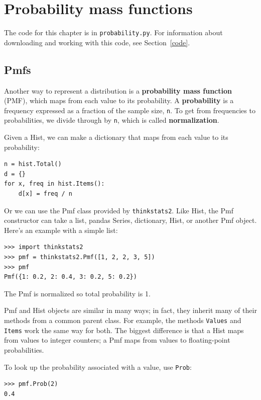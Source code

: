 \documentclass[12pt]{book}
\begin{document}
\chapter{Probability mass functions}

The code for this chapter is in \verb"probability.py".
For information about downloading and
working with this code, see Section~\ref{code}.


\section{Pmfs}

Another way to represent a distribution is a {\bf probability mass
  function} (PMF), which maps from each value to its probability.  A
{\bf probability} is a frequency expressed as a fraction of the sample
size, \verb"n".  To get from frequencies to probabilities, we divide
through by \verb"n", which is called {\bf normalization}.

Given a Hist, we can make a dictionary that maps from each
value to its probability: 
%
\begin{verbatim}
n = hist.Total()
d = {}
for x, freq in hist.Items():
    d[x] = freq / n
\end{verbatim}
%
Or we can use the Pmf class provided by \verb"thinkstats2".
Like Hist, the Pmf constructor can take a list, pandas
Series, dictionary, Hist, or another Pmf object.  Here's an example
with a simple list:
%
\begin{verbatim}
>>> import thinkstats2
>>> pmf = thinkstats2.Pmf([1, 2, 2, 3, 5])
>>> pmf
Pmf({1: 0.2, 2: 0.4, 3: 0.2, 5: 0.2})
\end{verbatim}

The Pmf is normalized so total probability is 1.

Pmf and Hist objects are similar in many ways; in fact, they inherit
many of their methods from a common parent class.  For example, the
methods \verb"Values" and \verb"Items" work the same way for both.  The
biggest difference is that a Hist maps from values to integer
counters; a Pmf maps from values to floating-point probabilities.

To look up the probability associated with a value, use \verb"Prob":
%
\begin{verbatim}
>>> pmf.Prob(2)
0.4
\end{verbatim}
\end{document}
